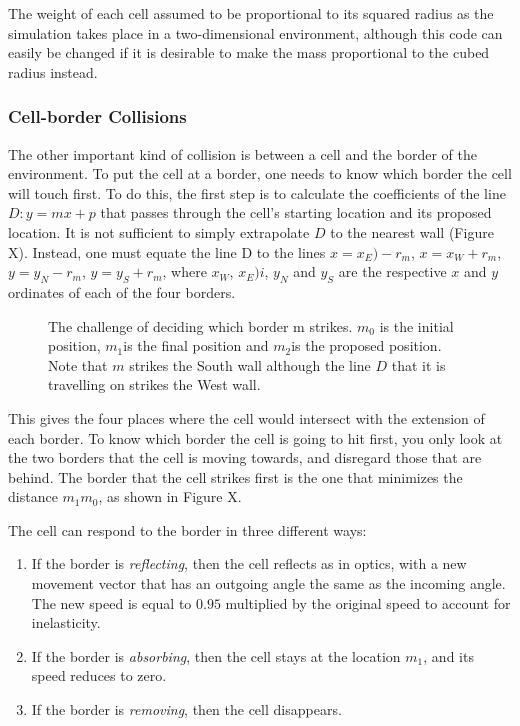 \documentclass[12pt]{article}
\begin{document}
\begin{figure}[H]
\centering
\end{figure}

The weight of each cell assumed to be proportional to its squared radius 
as the simulation takes place in a two-dimensional environment, although 
this code can easily be changed if it is desirable to make the mass 
proportional to the cubed radius instead.

\subsubsection{Cell-border Collisions}
The other important kind of collision is between a cell and the border 
of the environment. To put the cell at a border, one needs to know which 
border the cell will touch first. To do this, the first step is to 
calculate the coefficients of the line \(D: y=mx + p\) that passes through 
the cell's starting location and its proposed location. It is not 
sufficient to simply extrapolate \(D\) to the nearest wall (Figure X). 
Instead, one must equate the line D to the lines 
\(x = x_E) - r_m\), \(x = x_W + r_m\), \(y = y_N - r_m\), \(y = y_S + r_m\), 
where \(x_W\), \(x_E)i\), \(y_N\) and \(y_S\) are the respective \(x\) 
and \(y\) ordinates of each of the four borders.

\begin{figure}[H]
\centering
\caption{The challenge of deciding which border m 
  strikes. \(m_0\) is the initial position, \(m_1\)is the final 
  position and \(m_2\)is the proposed position. Note that \(m\) strikes 
  the South wall although the line \(D\) that it is travelling on strikes the 
West wall.}
\end{figure}

This gives the four places where the cell would intersect with the 
extension of each border. To know which border the cell is going to hit 
first, you only look at the two borders that the cell is moving towards, 
and disregard those that are behind. The border that the cell strikes 
first is the one that minimizes the distance \(m_1m_0\), as 
shown in Figure X. 

The cell can respond to the border in three different ways: 

\begin{enumerate}
  \item If the border is {\itshape reflecting}, then the cell reflects as in optics, 
with a new movement vector that has an outgoing angle the same as the 
incoming angle. The new speed is equal to \(0.95\) multiplied by the original speed
to account for inelasticity.
\item If the border is {\itshape absorbing}, then the cell stays at the location \(m_1\), 
  and its speed reduces to zero.
\item If the border is {\itshape removing}, then the cell disappears.
\end{enumerate}
\end{document}

